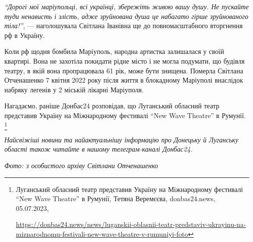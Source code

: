 


\begin{leftbar}
	\begingroup
\emph{\enquote{Дорогі мої маріупольці, всі українці, збережіть живою вашу душу. Не пускайте
туди ненависть і злість, адже зруйнована душа це набагато гірше зруйнованого
тіла!}}, — наголошувала Світлана Іванівна ще до повномасштабного вторгнення рф в Україну.
	\endgroup
\end{leftbar}

Коли рф щодня бомбила Маріуполь, народна артистка залишалася у своїй квартирі.
Вона не захотіла покидати рідне місто і не могла подумати, що будівля театру, в
якій вона пропрацювала 61 рік, може бути знищена. Померла Світлана Отченашенко
7 квітня 2022 року після життя в блокадному Маріуполі внаслідок набряку легенів
у 2 міській лікарні Маріуполя.

Нагадаємо, раніше Донбас24 розповідав, що Луганський обласний театр представив
Україну на Міжнародному фестивалі \enquote{New Wave Theatre} в Румунії.%
\footnote{Луганський обласний театр представив Україну на Міжнародному фестивалі \enquote{New Wave Theatre} в Румунії, %
Тетяна Веремєєва, donbas24.news, 05.07.2023, \par\url{https://donbas24.news/news/luganskii-oblasnii-teatr-predstaviv-ukrayinu-na-miznarodnomu-festivali-new-wave-theatre-v-rumuniyi-foto}}

\emph{Найсвіжіші новини та найактуальнішу інформацію про Донецьку й Луганську області
також читайте в нашому телеграм-каналі Донбас24.}

\emph{Фото: з особистого архіву Світлани Отченашенко}
